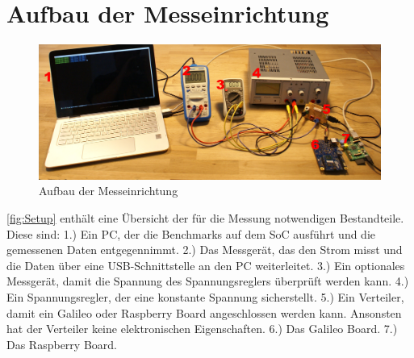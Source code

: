 
\section{Aufbau der Messeinrichtung}

\begin{figure}[H]
\centering
\includegraphics[width=1.0\textwidth]{images/setup.jpg}
\caption{Aufbau der Messeinrichtung}
\label{fig:Setup}
\end{figure}

\autoref{fig:Setup} enthält eine Übersicht der für die Messung notwendigen Bestandteile. Diese sind: 1.) Ein PC, der die Benchmarks auf dem SoC ausführt und die gemessenen Daten entgegennimmt. 2.) Das Messgerät, das den Strom misst und die Daten über eine USB-Schnittstelle an den PC weiterleitet. 3.) Ein optionales Messgerät, damit die Spannung des Spannungsreglers überprüft werden kann. 4.) Ein Spannungsregler, der eine konstante Spannung sicherstellt. 5.) Ein Verteiler, damit ein Galileo oder Raspberry Board angeschlossen werden kann. Ansonsten hat der Verteiler keine elektronischen Eigenschaften. 6.) Das Galileo Board. 7.) Das Raspberry Board.

